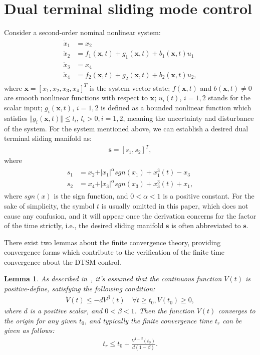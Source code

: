 \documentclass[3p]{elsarticle}
\theoremstyle{plain}
\newtheorem{mylem}{Lemma}
\theoremstyle{remark}
\begin{document}
\section{Dual terminal sliding mode control}\label{sec:2}
Consider a second-order nominal nonlinear system:
\begin{align}
\begin{split}
\dot x_1 &= x_2\\
\dot x_2 &= f_1(\bm x,t)+g_1(\bm x,t)+b_1(\bm x,t)u_1\\
\dot x_3 &= x_4\\
\dot x_4 &= f_2(\bm x,t)+g_2(\bm x,t)+b_2(\bm x,t)u_2,\label{eq:second-order system}
\end{split}
\end{align}
where $\bm x = [x_1,x_2,x_3,x_4]^T$ is the system vector state; $f(\bm x,t)$ and $b(\bm x,t)\neq 0$ are smooth nonlinear functions with respect to $\bm x$; $u_i(t)$, $i=1,2$ stands for the scalar input; $g_i(\bm x,t)$, $i=1,2$  is defined as a bounded nonlinear function which satisfies $\Vert g_i(\bm x,t)\Vert\le l_i$, $l_i>0, i=1,2$, meaning the uncertainty and disturbance of the system. For the system mentioned above, we can establish a desired dual terminal sliding manifold as:
\begin{align}
\bm s = [s_1,s_2]^T,
\end{align}
where
\begin{align}
\begin{split}
s_1 &= x_2+\vert x_1\vert^{\alpha} sgn(x_1)+x_1^3(t)-x_3\\
s_2 &= x_4+\vert x_3\vert^{\alpha} sgn(x_3)+x_3^3(t)+x_1,\label{eq:dual sliding manifold}
\end{split}
\end{align}
where $sgn(x)$ is the sign function, and $0<\alpha<1$ is a positive constant. For the sake of simplicity, the symbol $t$ is usually omitted in this paper, which does not cause any confusion, and it will appear once the derivation concerns for the factor of the time strictly, i.e., the desired sliding manifold $\bm s$ is often abbreviated to $\bm s$.\par
There exist two lemmas about the finite convergence theory, providing convergence forms which contribute to the verification of the finite time convergence about the DTSM control.
\begin{mylem}
As described in~\cite{moulay2006finite}, it's assumed that the continuous function $V(t)$ is positive-define, satisfying the following condition:
\begin{align}
\dot V(t)\le -dV^\beta(t)\quad\forall t\ge t_0, V(t_0)\ge 0,
\end{align}
where $d$ is a positive scalar, and $0<\beta<1$. Then the function $V(t)$ converges to the origin for any given $t_0$, and typically the finite convergence time $t_r$ can be given as follows:
\begin{align}
t_r \le t_0+\frac{V^{1-\beta}(t_0)}{d(1-\beta)}.
\end{align}\label{lemma:1}
\end{mylem}
\end{document}

